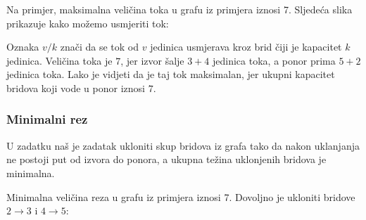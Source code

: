 Na primjer, maksimalna veličina toka
u grafu iz primjera iznosi 7.
Sljedeća slika prikazuje kako možemo
usmjeriti tok:

\begin{center}
\end{center}

Oznaka $v/k$ znači
da se tok od $v$ jedinica usmjerava kroz
brid čiji je kapacitet $k$ jedinica.
Veličina toka je $7$,
jer izvor šalje $3+4$ jedinica toka,
a ponor prima $5+2$ jedinica toka.
Lako je vidjeti da je taj tok maksimalan,
jer ukupni kapacitet bridova
koji vode u ponor iznosi $7$.

\subsubsection{Minimalni rez}


U zadatku 
naš je zadatak ukloniti skup
bridova iz grafa
tako da nakon uklanjanja ne postoji put od izvora
do ponora,
a ukupna težina uklonjenih bridova
je minimalna.

Minimalna veličina reza u grafu iz primjera iznosi 7.
Dovoljno je ukloniti bridove $2 \rightarrow 3$
i $4 \rightarrow 5$:

